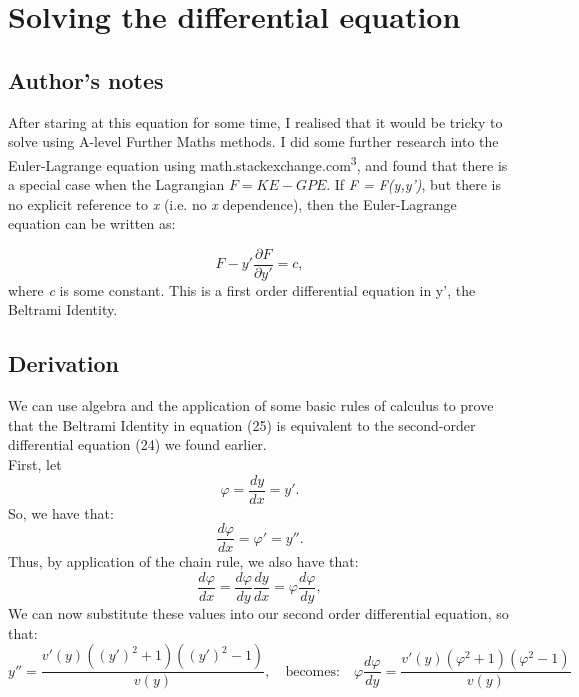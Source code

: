 \documentclass{article}
\begin{document}
\section{Solving the differential equation}
\subsection{Author's notes}
After staring at this equation for some time, I realised that it would be tricky to solve using A-level Further Maths methods. I did some further research into the Euler-Lagrange equation using math.stackexchange.com\textsuperscript 3, and found that there is a special case when the Lagrangian $F = KE - GPE$. If \textit{F = F(y,y')}, but there is no explicit reference to \textit{x} (i.e. no \textit{x} dependence), then the Euler-Lagrange equation can be written as:

\begin{equation}
    F - y' \frac{\partial F}{\partial y'} = c,
\end{equation}
where \textit{c} is some constant. 
This is a first order differential equation in y', the Beltrami Identity.
\subsection{Derivation}
We can use algebra and the application of some basic rules of calculus to prove that the Beltrami Identity in equation (25) is equivalent to the second-order differential equation (24) we found earlier.
\\
First, let 
\begin{equation}
    \varphi = \frac{dy}{dx} = y'.
\end{equation}
So, we have that:
\begin{equation}
    \frac{d\varphi}{dx} = \varphi' = y''.
\end{equation}
Thus, by application of the chain rule, we also have that:
\begin{equation}
    \frac{d\varphi}{dx} = \frac{d\varphi}{dy} \frac{dy}{dx} = \varphi \frac{d\varphi}{dy},
\end{equation}
We can now substitute these values into our second order differential equation, so that: 
\begin{equation}
    y'' = \frac{v'\left(y\right) \left(\left(y'\right)^2 + 1\right)\left(\left(y'\right)^2 - 1\right)}{v(y)}, \quad \text{becomes:} \quad \varphi \frac{d\varphi}{dy} = \frac{v'\left(y\right) \left(\varphi^2 + 1\right)\left(\varphi^2 - 1\right)}{v(y)}
\end{equation}
\end{document}
